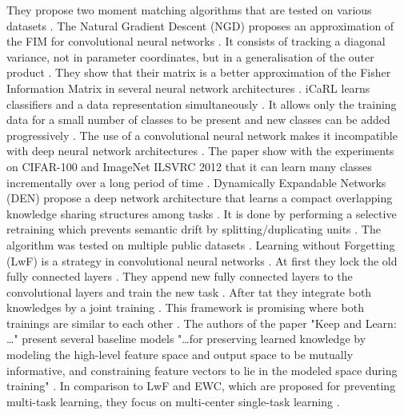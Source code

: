 They propose two moment matching algorithms that are tested on various datasets \cite{incremental-moment-matching}.
\newline
The Natural Gradient Descent (NGD) proposes an approximation of the FIM for convolutional neural networks \cite{natural_gradient_descent}.
It consists of tracking a diagonal variance, not in parameter coordinates, but in a generalisation of the outer product \cite{natural_gradient_descent}.
They show that their matrix is a better approximation of the Fisher Information Matrix in several neural network architectures \cite{natural_gradient_descent}.
\newline
iCaRL learns classifiers and a data representation simultaneously \cite{iCARL}.
It allows only the training data for a small number of classes to be present and new classes can be added progressively \cite{iCARL}.
The use of a convolutional neural network makes it incompatible with deep neural network architectures \cite{iCARL}.
The paper show with the experiments on CIFAR-100 and ImageNet ILSVRC 2012 that it can learn many classes incrementally over a long period of time \cite{iCARL}.
\newline
Dynamically Expandable Networks (DEN) propose a deep network architecture that learns a compact overlapping knowledge sharing structures among tasks \cite{DEN}.
It is done by performing a selective retraining which prevents semantic drift by splitting/duplicating units \cite{DEN}.
The algorithm was tested on multiple public datasets \cite{DEN}.
\newline
Learning without Forgetting (LwF) is a strategy in convolutional neural networks \cite{LwF}.
At first they lock the old fully connected layers \cite{LwF}.
They append new fully connected layers to the convolutional layers and train the new task \cite{LwF}.
After tat they integrate both knowledges by a joint training \cite{LwF}.
This framework is promising where both trainings are similar to each other \cite{incremental-moment-matching, LwF}.
\newline
The authors of the paper "Keep and Learn: …" \cite{Keep_and_Learn} present several baseline models "…for preserving learned knowledge by modeling the high-level feature space and output space to be mutually informative, and constraining feature vectors to lie in the modeled space during training" \cite{Keep_and_Learn}.
In comparison to LwF and EWC, which are proposed for preventing multi-task learning, they focus on multi-center single-task learning \cite{Keep_and_Learn}.
